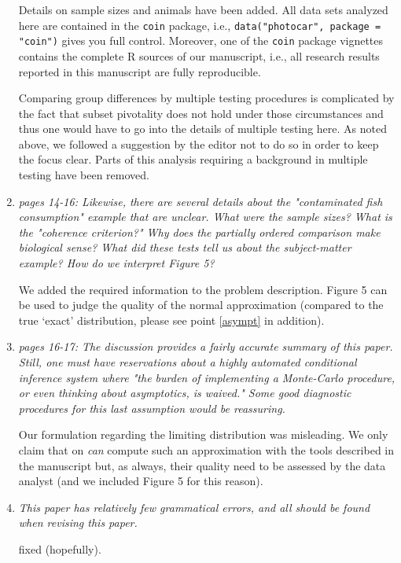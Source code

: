 \documentclass[11pt]{article}
\begin{document}
\begin{enumerate}
Details on sample sizes and animals have been added. All data sets analyzed
here are contained in the \texttt{coin} package, i.e., \texttt{data("photocar", package =
"coin")} gives you full control. Moreover, one of the \texttt{coin} package
vignettes contains the complete \textsf{R} sources of our manuscript, i.e.,
all research results reported in this manuscript are fully reproducible.

Comparing group differences by multiple testing procedures is complicated by
the fact that subset pivotality does not hold under those circumstances and
thus one would have to go into the details of multiple testing here. As
noted above, we followed a suggestion by the editor not to do so in order to
keep the focus clear. Parts of this analysis requiring a background in
multiple testing have been removed.

\item \textsl{pages 14-16:  Likewise, there are several details about the "contaminated fish 
              consumption" example that are unclear. What were the sample sizes? What is the 
              "coherence criterion?" Why does the partially ordered comparison make biological 
              sense? What did these tests tell us about the subject-matter example? How do we 
              interpret Figure 5? }

We added the required information to the problem description. Figure 5 can
be used to judge the quality of the normal approximation (compared to the
true `exact' distribution, please see point \ref{asympt} in addition).
 
\item \textsl{pages 16-17:  The discussion provides a fairly accurate summary of this paper. 
              Still, one must have reservations about a highly automated conditional inference 
              system where "the burden of implementing a Monte-Carlo procedure, or even thinking 
              about asymptotics, is waived." Some good diagnostic procedures for this last 
              assumption would be reassuring. }
 
Our formulation regarding the limiting distribution was misleading.
We only claim that on \textit{can} compute such an approximation with the
tools described in the manuscript but, as always, their quality need to be
assessed by the data analyst (and we included Figure 5 for this reason).

\item \textsl{This paper has relatively few grammatical errors, and all should be found when 
              revising this paper.}

fixed (hopefully).

\end{enumerate}



\end{document}
